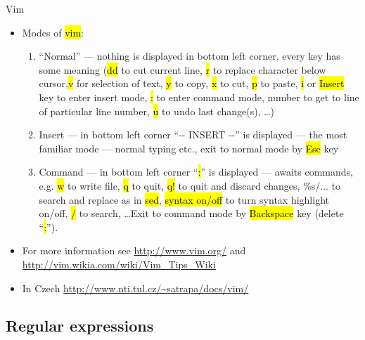 \documentclass[compress, ucs, xelatex, 11pt, xcolor=svgnames,
  hyperref={
    bookmarks=true,
    unicode=true,
    colorlinks=true,
    pdftitle={Linux, command line and MetaCentrum},
    plainpages=false,
    pdfauthor={Vojtech Zeisek},
    pdfsubject={Course about use of Linux command line, writing shell scripts and using MetaCentrum of CESNET},
    pdfcreator={XeLaTeX, http://www.xelatex.org/},
    pdfkeywords={Linux, GNU, BASH, shell, command line, MetaCentrum},
    linkcolor=Sienna,
    anchorcolor=black,
    citecolor=green,
    filecolor=magenta,
    menucolor=Sienna,
    urlcolor=cyan,
    pdftex},
  url={hyphens, lowtilde} %
  ]{beamer}
\renewcommand{\texttt}[1]{\hl{\ttfamily #1}}
\begin{document}
\begin{frame}{Vim}
\begin{itemize}
 \item Modes of \texttt{vim}:
  \begin{enumerate}
   \item ``Normal'' --- nothing is displayed in bottom left corner, every key has some meaning (\texttt{dd} to cut current line, \texttt{r} to replace character below cursor,\texttt{v} for selection of text, \texttt{y} to copy, \texttt{x} to cut, \texttt{p} to paste, \texttt{i} or \texttt{Insert} key to enter insert mode, \texttt{:} to enter command mode, number to get to line of particular line number, \texttt{u} to undo last change(s), \ldots)
   \item Insert --- in bottom left corner ``-{-} INSERT {-}-'' is displayed --- the most familiar mode --- normal typing etc., exit to normal mode by \texttt{Esc} key
   \item Command --- in bottom left corner ``\texttt{:}'' is displayed --- awaits commands, e.g. \texttt{w} to write file, \texttt{q} to quit, \texttt{q!} to quit and discard changes, \%s/... to search and replace as in \texttt{sed}, \texttt{syntax on/off} to turn syntax highlight on/off, \texttt{/} to search, \ldots Exit to command mode by \texttt{Backspace} key (delete ``\texttt{:}'').
  \end{enumerate}
  \item For more information see \url{http://www.vim.org/} and \url{http://vim.wikia.com/wiki/Vim_Tips_Wiki}
  \item In Czech \url{http://www.nti.tul.cz/~satrapa/docs/vim/}
\end{itemize}
\end{frame}

\subsection{Regular expressions}
\end{document}
